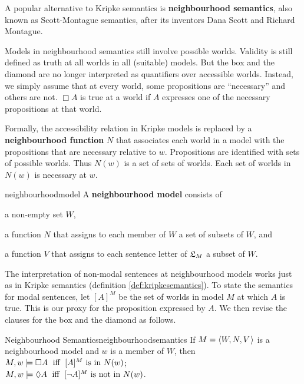 
A popular alternative to Kripke semantics is \textbf{neighbourhood semantics},
also known as Scott-Montague semantics, after its inventors Dana Scott and
Richard Montague.

Models in neighbourhood semantics still involve possible worlds. Validity is
still defined as truth at all worlds in all (suitable) models. But the box and
the diamond are no longer interpreted as quantifiers over accessible
worlds. Instead, we simply assume that at every world, some propositions are
``necessary'' and others are not.  $\Box A$ is true at a world if $A$ expresses
one of the necessary propositions at that world.

Formally, the accessibility relation in Kripke models is replaced by a
\textbf{neighbourhood function} $N$ that associates each world in a model with
the propositions that are necessary relative to $w$. Propositions are identified
with sets of possible worlds. Thus $N(w)$ is a set of sets of worlds. Each set
of worlds in $N(w)$ is necessary at $w$.


\begin{definition}{}{neighbourhoodmodel}
  A \textbf{neighbourhood model} consists of
  \vspace{-3mm}
  \begin{itemize*}
  \item a non-empty set $W$,
  \item a function $N$ that assigns to each member of $W$ a set of subsets of
  $W$, and
  \item a function $V$ that assigns to each sentence letter of $\mathfrak{L}_M$
    a subset of $W$.
  \end{itemize*}
\end{definition}

The interpretation of non-modal sentences at neighbourhood models works just as
in Kripke semantics (definition \ref{def:kripkesemantics}). To state the
semantics for modal sentences, let $[A]^M$ be the set of worlds in model $M$ at
which $A$ is true. This is our proxy for the proposition expressed by $A$. We then revise the clauses for the box and the diamond as follows.
%
%
\begin{definition}{Neighbourhood Semantics}{neighbourhoodsemantics}
    If $\Mfr = \t{W,N,V}$ is a neighbourhood model and $w$ is a member of $W$, then\\[1mm]
    $M,w \models \Box A \text{ \;iff\; $[A]^M$ is in $N(w)$}$;\\
    $M,w \models \Diamond A \text{ \;iff\; $[\neg A]^M$ is not in $N(w)$}$.
\end{definition}

